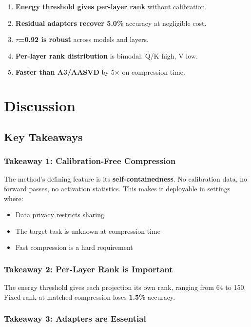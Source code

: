 \begin{enumerate}
\item \textbf{Energy threshold gives per-layer rank} without calibration.
\item \textbf{Residual adapters recover 5.0\%} accuracy at negligible cost.
\item \textbf{$\tau$=0.92 is robust} across models and layers.
\item \textbf{Per-layer rank distribution} is bimodal: Q/K high, V low.
\item \textbf{Faster than A3/AASVD} by 5$\times$ on compression time.
\end{enumerate}


\section{Discussion}

\subsection{Key Takeaways}

\subsubsection{Takeaway 1: Calibration-Free Compression}

The method's defining feature is its \textbf{self-containedness}. No calibration 
data, no forward passes, no activation statistics. This makes it deployable 
in settings where:
\begin{itemize}
\item Data privacy restricts sharing
\item The target task is unknown at compression time
\item Fast compression is a hard requirement

\end{itemize}
\subsubsection{Takeaway 2: Per-Layer Rank is Important}

The energy threshold gives each projection its own rank, ranging from 
64 to 150. Fixed-rank at matched compression loses 
\textbf{1.5\%} accuracy.

\subsubsection{Takeaway 3: Adapters are Essential}

